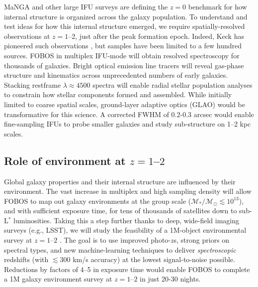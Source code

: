 MaNGA \citep{bundy15} and other large IFU surveys are defining the $z=0$ benchmark for how internal structure is organized across the galaxy population.  To understand and test ideas for how this internal structure emerged, we require spatially-resolved observations at $z = 1$--2, just after the peak formation epoch.  Indeed, Keck has pioneered such observations \citep[e.g.,][]{erb04, miller11,law09}, but samples have been limited to a few hundred sources.  FOBOS in multiplex IFU-mode will obtain resolved spectroscopy for thousands of galaxies.  Bright optical emission line tracers will reveal gas-phase structure and kinematics across unprecedented numbers of early galaxies.  Stacking restframe $\lambda \approx 4500$ spectra will enable radial stellar population analyses to constrain how stellar components formed and assembled.  While initially limited to coarse spatial scales, ground-layer adaptive optics (GLAO) would be transformative for this science.  A corrected FWHM of 0.2-0.3 arcsec would enable fine-sampling IFUs to probe smaller galaxies and study sub-structure on 1--2 kpc scales.


\subsection{Role of environment at $z=1$--$2$ }

Global galaxy properties and their internal structure are influenced by their environment.  The vast increase in multiplex and high sampling density will allow FOBOS to map out galaxy environments at the group scale ($\mathcal{M_\ast/M_\odot}
\lesssim 10^{13}$), and with sufficient exposure time, for tens of thousands of satellites down to sub-L$^*$
luminosities.  Taking this a step further thanks to deep, wide-field imaging surveys (e.g., LSST), we will study the
feasibility of a 1M-object environmental survey at $z=1$--$2$ .  The goal is to use improved photo-$z$s, strong priors
on spectral types, and new machine-learning techniques to deliver {\it spectroscopic} redshifts (with $\lesssim$300
km/s accuracy) at the lowest signal-to-noise possible. Reductions by factors of 4--5 in exposure time would enable
FOBOS to complete a 1M galaxy environment survey at $z=1$--$2$ in just 20-30 nights.


\noindent{}

